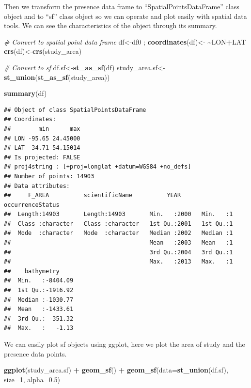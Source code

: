 \documentclass[
]{book}
\newenvironment{Shaded}{\begin{snugshade}}{\end{snugshade}}
\newcommand{\AttributeTok}[1]{\textcolor[rgb]{0.13,0.29,0.53}{#1}}
\newcommand{\CommentTok}[1]{\textcolor[rgb]{0.56,0.35,0.01}{\textit{#1}}}
\newcommand{\DecValTok}[1]{\textcolor[rgb]{0.00,0.00,0.81}{#1}}
\newcommand{\ErrorTok}[1]{\textcolor[rgb]{0.64,0.00,0.00}{\textbf{#1}}}
\newcommand{\FloatTok}[1]{\textcolor[rgb]{0.00,0.00,0.81}{#1}}
\newcommand{\FunctionTok}[1]{\textcolor[rgb]{0.13,0.29,0.53}{\textbf{#1}}}
\newcommand{\NormalTok}[1]{#1}
\newcommand{\OtherTok}[1]{\textcolor[rgb]{0.56,0.35,0.01}{#1}}
\newcommand{\SpecialCharTok}[1]{\textcolor[rgb]{0.81,0.36,0.00}{\textbf{#1}}}
\begin{document}
Then we transform the presence data frame to ``SpatialPointsDataFrame'' class object and to ``sf'' class object so we can operate and plot easily with spatial data tools. We can see the characteristics of the object through its summary.

\begin{Shaded}
\begin{Highlighting}[]
\CommentTok{\# Convert to spatial point data frame}
\NormalTok{df}\OtherTok{\textless{}{-}}\NormalTok{df0 ; }\FunctionTok{coordinates}\NormalTok{(df)}\OtherTok{\textless{}{-}} \ErrorTok{\textasciitilde{}}\NormalTok{LON}\SpecialCharTok{+}\NormalTok{LAT}
\FunctionTok{crs}\NormalTok{(df)}\OtherTok{\textless{}{-}}\FunctionTok{crs}\NormalTok{(study\_area)}

\CommentTok{\# Convert to sf}
\NormalTok{df.sf}\OtherTok{\textless{}{-}}\FunctionTok{st\_as\_sf}\NormalTok{(df)}
\NormalTok{study\_area.sf}\OtherTok{\textless{}{-}}\FunctionTok{st\_union}\NormalTok{(}\FunctionTok{st\_as\_sf}\NormalTok{(study\_area))}


\FunctionTok{summary}\NormalTok{(df)}
\end{Highlighting}
\end{Shaded}

\begin{verbatim}
## Object of class SpatialPointsDataFrame
## Coordinates:
##        min      max
## LON -95.65 24.45000
## LAT -34.71 54.15014
## Is projected: FALSE 
## proj4string : [+proj=longlat +datum=WGS84 +no_defs]
## Number of points: 14903
## Data attributes:
##     F_AREA          scientificName          YEAR      occurrenceStatus
##  Length:14903       Length:14903       Min.   :2000   Min.   :1       
##  Class :character   Class :character   1st Qu.:2001   1st Qu.:1       
##  Mode  :character   Mode  :character   Median :2002   Median :1       
##                                        Mean   :2003   Mean   :1       
##                                        3rd Qu.:2004   3rd Qu.:1       
##                                        Max.   :2013   Max.   :1       
##    bathymetry      
##  Min.   :-8404.09  
##  1st Qu.:-1916.92  
##  Median :-1030.77  
##  Mean   :-1433.61  
##  3rd Qu.: -351.32  
##  Max.   :   -1.13
\end{verbatim}

We can easily plot sf objects using ggplot, here we plot the area of study and the presence data points.

\begin{Shaded}
\begin{Highlighting}[]
\FunctionTok{ggplot}\NormalTok{(study\_area.sf) }\SpecialCharTok{+} 
  \FunctionTok{geom\_sf}\NormalTok{() }\SpecialCharTok{+} 
  \FunctionTok{geom\_sf}\NormalTok{(}\AttributeTok{data=}\FunctionTok{st\_union}\NormalTok{(df.sf),}
          \AttributeTok{size=}\DecValTok{1}\NormalTok{,}
          \AttributeTok{alpha=}\FloatTok{0.5}\NormalTok{)}
\end{Highlighting}
\end{Shaded}
\end{document}
